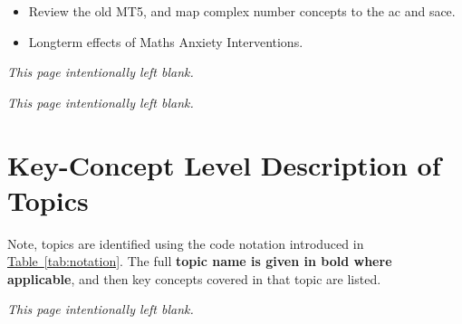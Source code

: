 \documentclass[twoside,12pt,a4paper]{report}
\makeatletter
\newcommand*{\intentionallyblankpage}{
  \vspace*{\fill}
  {\centering \textit{This page intentionally left blank.} \par}
  \vspace{\fill}}
\renewcommand*{\cleardoublepage}{\clearpage\if@twoside \ifodd\c@page\else
  \intentionallyblankpage
  \newpage
  \if@twocolumn\hbox{}\newpage\fi\fi\fi}
\newcommand{\reftab}[1]{\hyperref[tab:#1]{Table~\ref{tab:#1}}}
\makeatother
\begin{document}
\begin{itemize}
	\item Review the old MT5, and map complex number concepts to the \gls{ac} and \gls{sace}.
\end{itemize}	


\begin{itemize}
	\item Longterm effects of Maths Anxiety Interventions.
\end{itemize}

\cleardoublepage
\begin{appendices}

\cleardoublepage
\chapter{Key-Concept Level Description of Topics}
\label{app:concepts}

Note, topics are identified using the code notation introduced in \reftab{notation}. The full \textbf{topic name is given in bold where applicable}, and then key concepts covered in that topic are listed.



\end{appendices}

\glsresetall
\cleardoublepage

 
\end{document}
